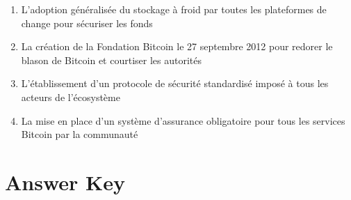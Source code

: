 \documentclass[12pt,a4paper]{article}
\begin{document}
\begin{enumerate}[label=\Alph*., leftmargin=*]
\item L'adoption généralisée du stockage à froid par toutes les plateformes de change pour sécuriser les fonds
\item La création de la Fondation Bitcoin le 27 septembre 2012 pour redorer le blason de Bitcoin et courtiser les autorités
\item L'établissement d'un protocole de sécurité standardisé imposé à tous les acteurs de l'écosystème
\item La mise en place d'un système d'assurance obligatoire pour tous les services Bitcoin par la communauté
\end{enumerate}

\bigskip


\newpage
\section*{Answer Key}
\end{document}
